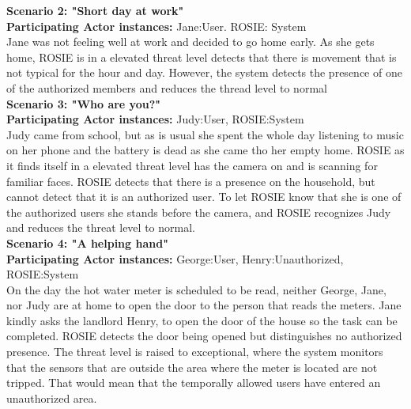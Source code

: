 \textbf{Scenario 2: "Short day at work"} \\
\textbf{Participating Actor instances:} Jane:User. ROSIE: System\\
Jane was not feeling well at work and decided to go home early. As she gets home, ROSIE is in a elevated threat level detects that there is movement that is not typical for the hour and day. However, the system detects the presence of one of the authorized members and reduces the thread level to normal \\

\textbf{Scenario 3: "Who are you?"} \\
\textbf{Participating Actor instances:} Judy:User, ROSIE:System\\
Judy came from school, but as is usual she spent the whole day listening to music on her phone and the battery is dead as she came tho her empty home. ROSIE as it finds itself in a elevated threat level has the camera on and is scanning for familiar faces. ROSIE detects that there is a presence on the household, but cannot detect that it is an authorized user. To let ROSIE know that she is one of the authorized users she stands before the camera, and ROSIE recognizes Judy and reduces the threat level to normal.  \\

\textbf{Scenario 4: "A helping hand"} \\
\textbf{Participating Actor instances:} George:User, Henry:Unauthorized, ROSIE:System\\
On the day the hot water meter is scheduled to be read, neither George, Jane, nor Judy are at home to open the door to the person that reads the meters. Jane kindly asks the landlord Henry, to open the door of the house so the task can be completed. ROSIE detects the door being opened but distinguishes no authorized presence. The threat level is raised to exceptional, where the system monitors that the sensors that are outside the area where the meter is located are not tripped. That would mean that the temporally allowed users have entered an unauthorized area. \\

